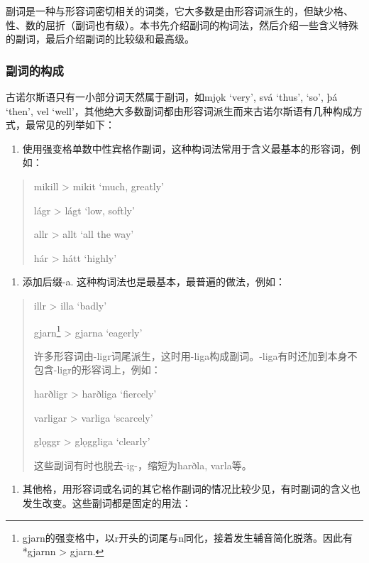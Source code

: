 副词是一种与形容词密切相关的词类，它大多数是由形容词派生的，但缺少格、性、数的屈折（副词也有级）。本书先介绍副词的构词法，然后介绍一些含义特殊的副词，最后介绍副词的比较级和最高级。

\subsubsection{副词的构成}\label{副词的构成}

古诺尔斯语只有一小部分词天然属于副词，如mjǫk `very', svá `thus', `so',
þá `then', vel
`well'，其他绝大多数副词都由形容词派生而来古诺尔斯语有几种构成方式，最常见的列举如下：

\begin{enumerate}
\def\labelenumi{\arabic{enumi})}
\item
  使用强变格单数中性宾格作副词，这种构词法常用于含义最基本的形容词，例如：
\end{enumerate}

\begin{quote}
mikill \textgreater{} mikit `much, greatly‌'

lágr \textgreater{} lágt `low, softly‌'

allr \textgreater{} allt `all the way‌'

hár \textgreater{} hátt `highly‌'
\end{quote}

\begin{enumerate}
\def\labelenumi{\arabic{enumi})}
\setcounter{enumi}{1}
\item
  添加后缀-a. 这种构词法也是最基本，最普遍的做法，例如：
\end{enumerate}

\begin{quote}
illr \textgreater{} illa `badly‌'

gjarn\footnote{gjarn的强变格中，以r开头的词尾与n同化，接着发生辅音简化脱落。因此有*gjarnn
  \textgreater{} gjarn.} \textgreater{} gjarna `eagerly‌'

许多形容词由-ligr词尾派生，这时用-liga构成副词。-liga有时还加到本身不包含-ligr的形容词上，例如：

harðligr \textgreater{} harðliga `fiercely‌'

varligar \textgreater{} varliga `scarcely‌'

glǫggr \textgreater{} glǫggliga `clearly'

这些副词有时也脱去-ig-，缩短为harðla, varla等。
\end{quote}

\begin{enumerate}
\def\labelenumi{\arabic{enumi})}
\setcounter{enumi}{2}
\item
  其他格，用形容词或名词的其它格作副词的情况比较少见，有时副词的含义也发生改变。这些副词都是固定的用法：
\end{enumerate}

